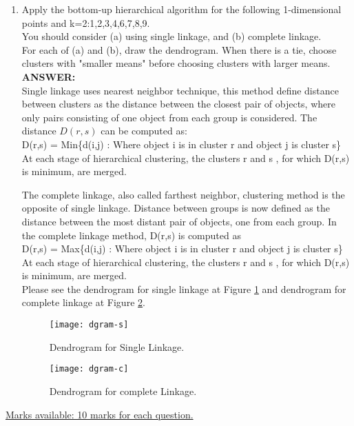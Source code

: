 \documentclass{article}
\begin{document}
\begin{enumerate}
\item Apply the bottom-up hierarchical algorithm for the following
  1-dimensional points and k=2:1,2,3,4,6,7,8,9.\\
  You should consider (a) using single linkage, and (b) complete
  linkage.\\ 
  For each of (a) and (b), draw the dendrogram. When there is a tie,
  choose clusters with "smaller means" before choosing clusters with
  larger means. \\
\textbf{ANSWER:} \\
Single linkage uses nearest neighbor technique, this method define
distance between clusters as the distance between the closest pair of
objects, where only pairs consisting of one object from each group is
considered. The distance $D(r,s)$ can be computed as: \\

D(r,s) = Min\{d(i,j) : Where object i is in cluster r and object j is
 cluster s\} \\

At each stage of hierarchical clustering, the clusters r and s , for
which D(r,s) is minimum, are merged.

The complete linkage, also called farthest neighbor, clustering method
is the opposite of single linkage.  Distance between groups is now
defined as the distance between the most distant pair of objects, one
from each group. 
In the complete linkage method, D(r,s) is computed as \\

D(r,s) = Max\{d(i,j) : Where object i is in cluster r and object j is
 cluster s\} \\

At each stage of hierarchical clustering, the clusters r and s , for
which D(r,s) is minimum, are merged. \\
Please see the dendrogram for single linkage at Figure
\ref{fig:dgram-s} and dendrogram for complete linkage at Figure
\ref{fig:dgram-c}. 

\begin{figure}[H]
  \vspace{-10pt}
  \begin{center}
    \texttt{[image: dgram-s]}
    \caption{Dendrogram for Single Linkage.\label{fig:dgram-s}}
  \end{center}
  \vspace{-20pt}
\end{figure}

\begin{figure}[H]
  \vspace{-10pt}
  \begin{center}
    \texttt{[image: dgram-c]}
    \caption{Dendrogram for complete Linkage.\label{fig:dgram-c}}
  \end{center}
  \vspace{-20pt}
\end{figure}

\end{enumerate} %

\underline{Marks available: 10 marks for each question.}
\end{document}
